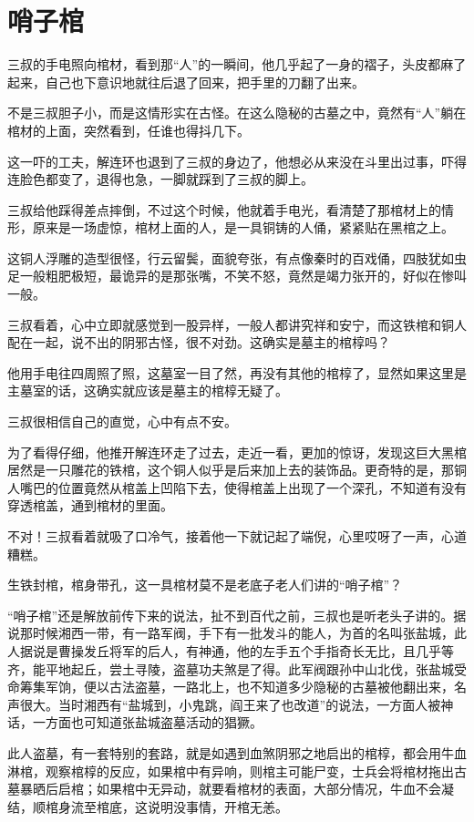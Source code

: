 \chapter{哨子棺}

三叔的手电照向棺材，看到那“人”的一瞬间，他几乎起了一身的褶子，头皮都麻了起来，自己也下意识地就往后退了回来，把手里的刀翻了出来。

不是三叔胆子小，而是这情形实在古怪。在这么隐秘的古墓之中，竟然有“人”躺在棺材的上面，突然看到，任谁也得抖几下。

这一吓的工夫，解连环也退到了三叔的身边了，他想必从来没在斗里出过事，吓得连脸色都变了，退得也急，一脚就踩到了三叔的脚上。

三叔给他踩得差点摔倒，不过这个时候，他就着手电光，看清楚了那棺材上的情形，原来是一场虚惊，棺材上面的人，是一具铜铸的人俑，紧紧贴在黑棺之上。

这铜人浮雕的造型很怪，行云留鬓，面貌夸张，有点像秦时的百戏俑，四肢犹如虫足一般粗肥极短，最诡异的是那张嘴，不笑不怒，竟然是竭力张开的，好似在惨叫一般。

三叔看着，心中立即就感觉到一股异样，一般人都讲究祥和安宁，而这铁棺和铜人配在一起，说不出的阴邪古怪，很不对劲。这确实是墓主的棺椁吗？

他用手电往四周照了照，这墓室一目了然，再没有其他的棺椁了，显然如果这里是主墓室的话，这确实就应该是墓主的棺椁无疑了。

三叔很相信自己的直觉，心中有点不安。

为了看得仔细，他推开解连环走了过去，走近一看，更加的惊讶，发现这巨大黑棺居然是一只雕花的铁棺，这个铜人似乎是后来加上去的装饰品。更奇特的是，那铜人嘴巴的位置竟然从棺盖上凹陷下去，使得棺盖上出现了一个深孔，不知道有没有穿透棺盖，通到棺材的里面。

不对！三叔看着就吸了口冷气，接着他一下就记起了端倪，心里哎呀了一声，心道糟糕。

生铁封棺，棺身带孔，这一具棺材莫不是老底子老人们讲的“哨子棺”？

“哨子棺”还是解放前传下来的说法，扯不到百代之前，三叔也是听老头子讲的。据说那时候湘西一带，有一路军阀，手下有一批发斗的能人，为首的名叫张盐城，此人据说是曹操发丘将军的后人，有神通，他的左手五个手指奇长无比，且几乎等齐，能平地起丘，尝土寻陵，盗墓功夫煞是了得。此军阀跟孙中山北伐，张盐城受命筹集军饷，便以古法盗墓，一路北上，也不知道多少隐秘的古墓被他翻出来，名声很大。当时湘西有“盐城到，小鬼跳，阎王来了也改道”的说法，一方面人被神话，一方面也可知道张盐城盗墓活动的猖獗。

此人盗墓，有一套特别的套路，就是如遇到血煞阴邪之地启出的棺椁，都会用牛血淋棺，观察棺椁的反应，如果棺中有异响，则棺主可能尸变，士兵会将棺材拖出古墓暴晒后启棺；如果棺中无异动，就要看棺材的表面，大部分情况，牛血不会凝结，顺棺身流至棺底，这说明没事情，开棺无恙。

